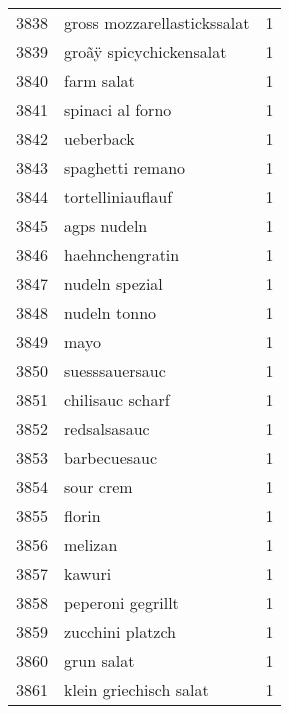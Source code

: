 \begin{tabular}{llr}
3838 &                        gross mozzarellastickssalat &      1 \\
3839 &                            groãÿ spicychickensalat &      1 \\
3840 &                                         farm salat &      1 \\
3841 &                                   spinaci al forno &      1 \\
3842 &                                          ueberback &      1 \\
3843 &                                   spaghetti remano &      1 \\
3844 &                                  tortelliniauflauf &      1 \\
3845 &                                        agps nudeln &      1 \\
3846 &                                    haehnchengratin &      1 \\
3847 &                                     nudeln spezial &      1 \\
3848 &                                       nudeln tonno &      1 \\
3849 &                                               mayo &      1 \\
3850 &                                     suesssauersauc &      1 \\
3851 &                                   chilisauc scharf &      1 \\
3852 &                                       redsalsasauc &      1 \\
3853 &                                       barbecuesauc &      1 \\
3854 &                                          sour crem &      1 \\
3855 &                                             florin &      1 \\
3856 &                                            melizan &      1 \\
3857 &                                             kawuri &      1 \\
3858 &                                  peperoni gegrillt &      1 \\
3859 &                                   zucchini platzch &      1 \\
3860 &                                         grun salat &      1 \\
3861 &                             klein griechisch salat &      1 \\

\end{tabular}
